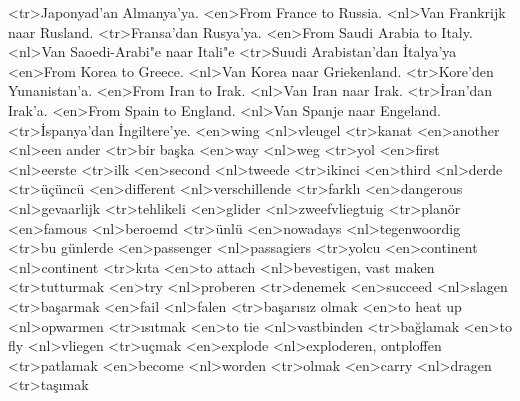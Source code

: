 <tr>Japonyad'an Almanya'ya.
<en>From France to Russia.
<nl>Van Frankrijk naar Rusland.
<tr>Fransa'dan Rusya'ya.
<en>From Saudi Arabia to Italy.
<nl>Van Saoedi-Arabi"e naar Itali"e
<tr>Suudi Arabistan'dan İtalya'ya
<en>From Korea to Greece.
<nl>Van Korea naar Griekenland.
<tr>Kore'den Yunanistan'a.
<en>From Iran to Irak.
<nl>Van Iran naar Irak.
<tr>İran'dan Irak’a.
<en>From Spain to England.
<nl>Van Spanje naar Engeland.
<tr>İspanya'dan İngiltere'ye.
<en>wing
<nl>vleugel
<tr>kanat
<en>another
<nl>een ander
<tr>bir başka
<en>way
<nl>weg
<tr>yol
<en>first
<nl>eerste
<tr>ilk
<en>second
<nl>tweede
<tr>ikinci
<en>third
<nl>derde
<tr>üçüncü
<en>different
<nl>verschillende
<tr>farklı
<en>dangerous
<nl>gevaarlijk
<tr>tehlikeli
<en>glider
<nl>zweefvliegtuig
<tr>planör
<en>famous
<nl>beroemd
<tr>ünlü
<en>nowadays
<nl>tegenwoordig
<tr>bu günlerde
<en>passenger
<nl>passagiers
<tr>yolcu
<en>continent
<nl>continent
<tr>kıta
<en>to attach
<nl>bevestigen, vast maken
<tr>tutturmak
<en>try
<nl>proberen
<tr>denemek
<en>succeed
<nl>slagen
<tr>başarmak
<en>fail
<nl>falen
<tr>başarısız olmak
<en>to heat up
<nl>opwarmen
<tr>ısıtmak
<en>to tie
<nl>vastbinden
<tr>bağlamak
<en>to fly
<nl>vliegen
<tr>uçmak
<en>explode
<nl>exploderen, ontploffen
<tr>patlamak
<en>become
<nl>worden
<tr>olmak
<en>carry
<nl>dragen
<tr>taşımak
